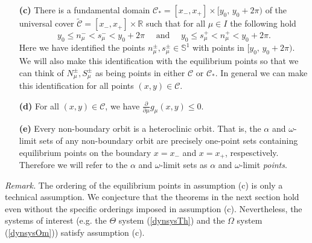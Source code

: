 \documentclass[11 pt]{article}
\renewcommand\({\left(}
\renewcommand\){\right)}
\newcommand\wt{\widetilde}
\newcommand\<{\langle}
\renewcommand\>{\rangle}
\newcommand\8{\infty}
\renewcommand\a{\alpha}
\newcommand{\R}{\mathbb R}
\newcommand{\pd}{\partial}
\newcommand{\mc}{\mathcal}
\newcommand{\Sset}{\mathbb{S}}
\begin{document}
\begin{enumerate}
When $f'(x_{\pm}) = 0$, the equilibrium points are nonhyperbolic and so one cannot apply the stable manifold theorem. In this case the orbits emanatings from $S^\pm_\mu$ are center manifolds and so they may not be unique. However, we will assume conditions on $f$ and $g_\mu$ so that these center manifolds are unique, and we will still refer to them as unstable manifolds. Therefore it always makes sense to speak of \emph{the} unstable manifold emanating from $S^{\pm}_\mu$.

\item[\bf{(c)}] There is a fundamental domain $\mc{C}_* = [x_-, x_+] \times [y_0,\,y_0 + 2\pi)$ of the universal cover $\wt{\mc{C}} = [x_-, x_+] \times \R$ such that for all $\mu \in I$ the following hold
\[
 y_0 \leq n^-_\mu < s^-_\mu < y_0 + 2\pi \quad \text{ and } \quad y_0 \leq s^+_\mu < n^+_\mu < y_0 + 2\pi.
\]
Here we have identified the points $n^\pm_\mu, s^\pm_\mu \in \Sset^1$ with points in $[y_0,\, y_0 + 2\pi)$. We will also make this identification with the equilibrium points so that we can think of $N^\pm_\mu, S^\pm_\mu$ as being points in either $\mc{C}$ or $\mc{C}_*$. In general we can make this identification for all points $(x,y) \in \mc{C}$.

\item[\bf{(d)}] For all $(x,y) \in \mc{C}$, we have $\frac{\pd}{\pd \mu}g_\mu(x,y) \leq 0$. 

\item[\bf{(e)}] Every non-boundary orbit is a heteroclinic orbit. That is, the $\a$ and $\omega$-limit sets of any non-boundary orbit are precisely one-point sets containing equilibrium points on the boundary $x = x_-$ and $x= x_+$, respesctively.  Therefore we will refer to the $\alpha$ and $\omega$-limit sets as $\a$ and $\omega$-limit \emph{points}.

\end{enumerate}

\noindent\emph{Remark.} The ordering of the equilibrium points in assumption (c) is only a technical assumption. We conjecture that the theorems in the next section hold even without the specific orderings imposed in assumption (c). Nevertheless, the systems of interest (e.g. the $\Theta$ system (\ref{dynsysTh}) and the $\Omega$ system (\ref{dynsysOm})) satisfy assumption (c). 


\medskip
\medskip
\end{document}
